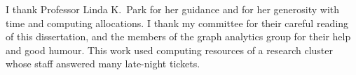 I thank Professor Linda K.\ Park for her guidance and for her generosity with time and
computing allocations. I thank my committee for their careful reading of this dissertation,
and the members of the graph analytics group for their help and good humour. This work used
computing resources of a research cluster whose staff answered many late-night tickets.

